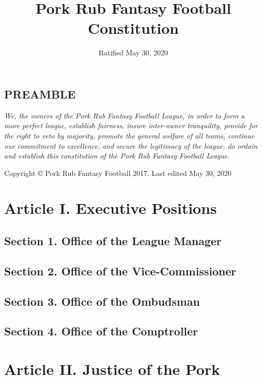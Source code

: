 \documentclass{article}
\title{Pork Rub Fantasy Football Constitution}
\date{Ratified May 30, 2020}
\begin{document}
\begin{titlepage}
    \maketitle
\end{titlepage}
\begin{center}
    \section*{PREAMBLE}
\end{center}

\textit{We, the owners of the Pork Rub Fantasy Football League, in order to form a more perfect league, establish fairness, insure inter-owner tranquility, provide for the right to veto by majority, promote the general welfare of all teams, continue our commitment to excellence, and secure the legitimacy of the league, do ordain and establish this constitution of the Pork Rub Fantasy Football League.}

\newpage
\begin{center}
   	Copyright \copyright{} Pork Rub Fantasy Football 2017. Last edited May 30, 2020
\end{center}

\newpage
\tableofcontents
\newpage
\section{Article I. Executive Positions}
	\subsection*{Section 1. Office of the League Manager}
	\subsection*{Section 2. Office of the Vice-Commissioner}
	\subsection*{Section 3. Office of the Ombudsman}
	\subsection*{Section 4. Office of the Comptroller}

\section{Article II. Justice of the Pork}
\end{document}
